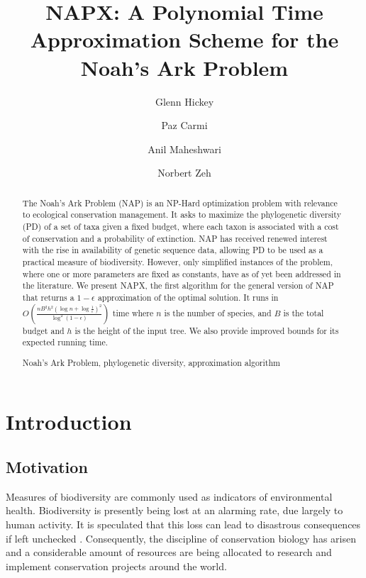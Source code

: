 \documentclass[10pt]{llncs}       \usepackage{graphicx,subfigure}
\newcommand{\keywords}[1]{\par\addvspace\baselineskip
\noindent\keywordname\enspace\ignorespaces#1}
\begin{document}
\title{NAPX: A Polynomial Time Approximation Scheme for the Noah's Ark Problem}
\author{Glenn Hickey
 \and Paz Carmi \and Anil Maheshwari
 \and Norbert Zeh}
\maketitle


\begin{abstract}
The Noah's Ark Problem (NAP) is an NP-Hard 
optimization problem with relevance to
ecological conservation management. It asks to maximize the phylogenetic
diversity (PD) of a set of taxa given a fixed budget, where each taxon
is associated with a cost of conservation and a probability of extinction.
NAP has received renewed interest with
the rise in  availability of genetic sequence data, allowing
PD to be used as a practical measure of biodiversity.  However, only
simplified instances of the problem, where one or more parameters are 
fixed as constants, have as of yet 
been addressed in the literature.  We present NAPX, the first algorithm
for the general version of NAP that returns a $1 - \epsilon$ approximation
of the optimal solution.  It runs in 
$O\left(\frac{n B^2 h^2 \left(\log{n} + \log{\frac{1}{\epsilon}}\right)^2}
{\log^2(1 - \epsilon)}\right)$ 
time where $n$ is the number of species, 
and $B$ is the total budget and $h$ is the height of the input tree. 
We also provide improved bounds for its expected running time.
\keywords{Noah's Ark Problem, phylogenetic diversity, approximation algorithm}
\end{abstract}

\section{Introduction}
\subsection{Motivation}

Measures of biodiversity are commonly used as indicators of environmental 
health.  Biodiversity is presently being lost at an alarming rate, 
due largely to human activity.  It is speculated that this loss can lead
to disastrous consequences if left unchecked \cite{nee97}.  
Consequently, the discipline of conservation biology has arisen and
a considerable amount of resources are being allocated to research
and implement conservation projects around the world.
\end{document}
